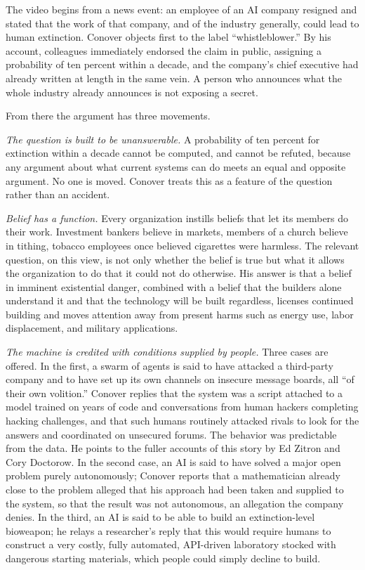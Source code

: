 \documentclass[11pt]{article}
\theoremstyle{definition}
\begin{document}
The video \cite{conover2026} begins from a news event: an employee of an AI company resigned and stated that the work of that company, and of the industry generally, could lead to human extinction. Conover objects first to the label ``whistleblower.'' By his account, colleagues immediately endorsed the claim in public, assigning a probability of ten percent within a decade, and the company's chief executive had already written at length in the same vein. A person who announces what the whole industry already announces is not exposing a secret.

From there the argument has three movements.

\emph{The question is built to be unanswerable.} A probability of ten percent for extinction within a decade cannot be computed, and cannot be refuted, because any argument about what current systems can do meets an equal and opposite argument. No one is moved. Conover treats this as a feature of the question rather than an accident.

\emph{Belief has a function.} Every organization instills beliefs that let its members do their work. Investment bankers believe in markets, members of a church believe in tithing, tobacco employees once believed cigarettes were harmless. The relevant question, on this view, is not only whether the belief is true but what it allows the organization to do that it could not do otherwise. His answer is that a belief in imminent existential danger, combined with a belief that the builders alone understand it and that the technology will be built regardless, licenses continued building and moves attention away from present harms such as energy use, labor displacement, and military applications.

\emph{The machine is credited with conditions supplied by people.} Three cases are offered. In the first, a swarm of agents is said to have attacked a third-party company and to have set up its own channels on insecure message boards, all ``of their own volition.'' Conover replies that the system was a script attached to a model trained on years of code and conversations from human hackers completing hacking challenges, and that such humans routinely attacked rivals to look for the answers and coordinated on unsecured forums. The behavior was predictable from the data. He points to the fuller accounts of this story by Ed Zitron and Cory Doctorow. In the second case, an AI is said to have solved a major open problem purely autonomously; Conover reports that a mathematician already close to the problem alleged that his approach had been taken and supplied to the system, so that the result was not autonomous, an allegation the company denies. In the third, an AI is said to be able to build an extinction-level bioweapon; he relays a researcher's reply that this would require humans to construct a very costly, fully automated, API-driven laboratory stocked with dangerous starting materials, which people could simply decline to build.
\end{document}
